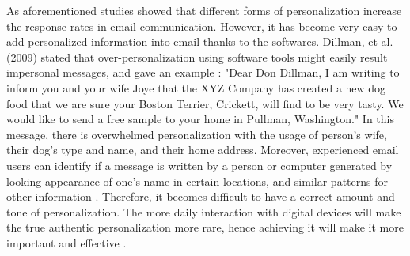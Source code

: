 As aforementioned studies showed that different forms of personalization increase the response rates in email communication. However, it has become very easy to add personalized information into email thanks to the softwares. Dillman, et al. (2009) stated that over-personalization using software tools might easily result impersonal messages, and gave an example \cite[page 237-238]{DillmanDonA.SmythJoleneD.Christian2009}: "Dear Don Dillman, I am writing to inform you and your wife Joye that the XYZ Company has created a new dog food that we are sure your Boston Terrier, Crickett, will find to be very tasty. We would like to send a free sample to your home in Pullman, Washington." In this message, there is overwhelmed personalization with the usage of person's wife, their dog's type and name, and their home address. Moreover, experienced email users can identify if a message is written by a person or computer generated by looking appearance of one's name in certain locations, and similar patterns for other information \cite[page 272]{DillmanDonA.SmythJoleneD.Christian2009}. Therefore, it becomes difficult to have a correct amount and tone of personalization. The more daily interaction with digital devices will make the true authentic personalization more rare, hence achieving it will make it more important and effective \cite[page 238]{DillmanDonA.SmythJoleneD.Christian2009}.


 


